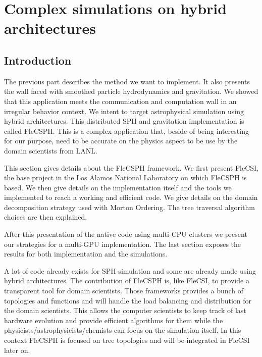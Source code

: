 \chapter{Complex simulations on hybrid architectures}

\section{Introduction}

The previous part describes the method we want to implement.
It also presents the wall faced with smoothed particle hydrodynamics and gravitation. 
We showed that this application meets the communication and computation wall in an irregular behavior context. 
We intent to target astrophysical simulation using hybrid architectures. 
This distributed SPH and gravitation implementation is called FleCSPH. 
This is a complex application that, beside of being interesting for our purpose, need to be accurate on the physics aspect to be use by the domain scientists from LANL. 

This section gives details about the FleCSPH framework. 
We first present FleCSI, the base project in the Los Alamos National Laboratory on which FleCSPH is based. 
We then give details on the implementation itself and the tools we implemented to reach a working and efficient code. 
We give details on the domain decomposition strategy used with Morton Ordering. 
The tree traversal algorithm choices are then explained. 

After this presentation of the native code using multi-CPU clusters we present our strategies for a multi-GPU implementation. 
The last section exposes the results for both implementation and the simulations. 

A lot of code already exists for SPH simulation and some are already made using hybrid architectures.
The contribution of FleCSPH is, like FleCSI, to provide a transparent tool for domain scientists. 
Those frameworks provides a bunch of topologies and functions and will handle the load balancing and distribution for the domain scientists. 
This allows the computer scientists to keep track of last hardware evolution and provide efficient algorithms for them while the physicists/astrophysicists/chemists can focus on the simulation itself. 
In this context FleCSPH is focused on tree topologies and will be integrated in FleCSI later on. 

